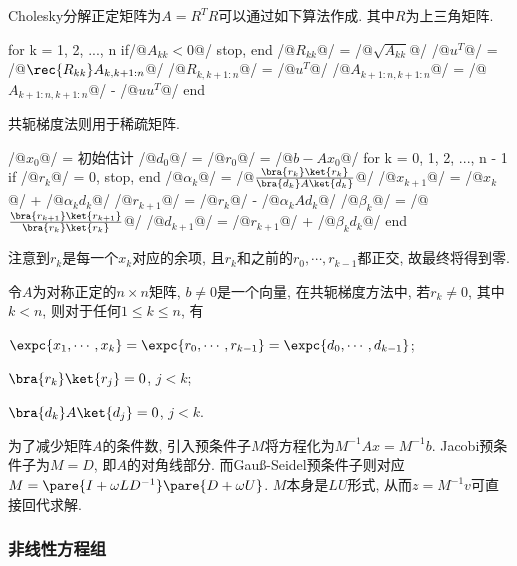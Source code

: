 \documentclass{ctexart}
\begin{document}
Cholesky分解正定矩阵为$A=R^TR$可以通过如下算法作成. 其中$R$为上三角矩阵.
\begin{matlablst}
for k = 1, 2, ..., n
    if/@$A_{kk}<0$@/ stop, end
    /@$R_{kk}$@/ = /@$\sqrt{A_{kk}}$@/
    /@$u^T$@/ = /@$\rec{R_{kk}}A_{k,k+1:n}$@/
    /@$R_{k,k+1:n}$@/ = /@$u^T$@/
    /@$A_{k+1:n,k+1:n}$@/ = /@$A_{k+1:n,k+1:n}$@/ - /@$uu^T$@/
end
\end{matlablst}
共轭梯度法则用于稀疏矩阵.
\begin{matlablst}
/@$x_0$@/ = 初始估计
/@$d_0$@/ = /@$r_0$@/ = /@$b-Ax_0$@/
for k = 0, 1, 2, ..., n - 1
    if /@$r_k$@/ = 0, stop, end
    /@$\alpha_k$@/ = /@$\frac{\bra{r_k}\ket{r_k}}{\bra{d_k}A\ket{d_k}}$@/
    /@$x_{k+1}$@/ = /@$x_k$@/ + /@$\alpha_kd_k$@/
    /@$r_{k+1}$@/ = /@$r_k$@/ - /@$\alpha_kAd_k$@/
    /@$\beta_k$@/ = /@$\frac{\bra{r_{k+1}}\ket{r_{k+1}}}{\bra{r_k}\ket{r_k}}$@/
    /@$d_{k+1}$@/ = /@$r_{k+1}$@/ + /@$\beta_k d_k$@/
end
\end{matlablst}
注意到$r_k$是每一个$x_k$对应的余项, 且$r_k$和之前的$r_0,\cdots,r_{k-1}$都正交, 故最终将得到零.

\begin{theorem}
    令$A$为对称正定的$n\times n$矩阵, $b\neq 0$是一个向量, 在共轭梯度方法中, 若$r_k\neq 0$, 其中$k<n$, 则对于任何$1\le k\le n$, 有
    \begin{cenum}
        \item $\expc{x_1,\cdots,x_k} = \expc{r_0,\cdots,r_{k-1}} = \expc{d_0,\cdots,d_{k-1}}$;
        \item $\bra{r_k}\ket{r_j} = 0$, $j < k$;
        \item $\bra{d_k}A\ket{d_j} = 0$, $j < k$.
    \end{cenum}
\end{theorem}

\par
为了减少矩阵$A$的条件数, 引入预条件子$M$将方程化为$M^{-1}Ax = M^{-1}b$. Jacobi预条件子为$M=D$, 即$A$的对角线部分. 而Gau\ss-Seidel预条件子则对应$M = \pare{I+\omega LD^{-1}}\pare{D+\omega U}$. $M$本身是$LU$形式, 从而$z=M^{-1}v$可直接回代求解.


\subsubsection{非线性方程组} %
\label{ssub:非线性方程组}
\end{document}

